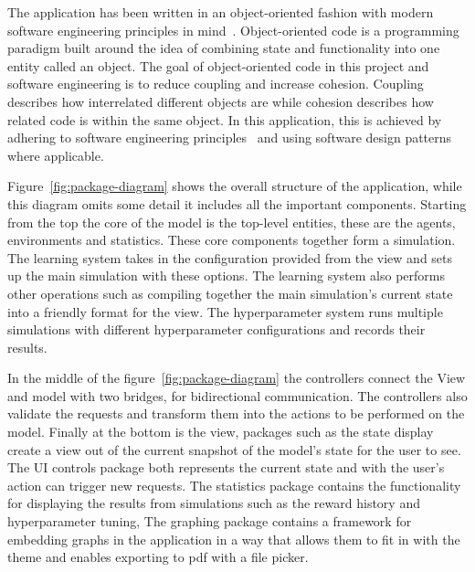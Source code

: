 \documentclass[]{final_report}
\begin{document}
The application has been written in an object-oriented fashion with modern software engineering principles in mind~\cite{van2008software}. Object-oriented code is a programming paradigm built around the idea of combining state and functionality into one entity called an object. The goal of object-oriented code in this project and software engineering is to reduce coupling and increase cohesion. Coupling describes how interrelated different objects are while cohesion describes how related code is within the same object. In this application, this is achieved by adhering to software engineering principles~\cite{softwareEngineringPrinciples} and using software design patterns where applicable.

Figure~\ref{fig:package-diagram} shows the overall structure of the application, while this diagram omits some detail it includes all the important components. Starting from the top the core of the model is the top-level entities, these are the agents, environments and statistics. These core components together form a simulation. The learning system takes in the configuration provided from the view and sets up the main simulation with these options. The learning system also performs other operations such as compiling together the main simulation's current state into a friendly format for the view. The hyperparameter system runs multiple simulations with different hyperparameter configurations and records their results.

In the middle of the figure~\ref{fig:package-diagram} the controllers connect the View and model with two bridges, for bidirectional communication. The controllers also validate the requests and transform them into the actions to be performed on the model. Finally at the bottom is the view, packages such as the state display create a view out of the current snapshot of the model's state for the user to see. The UI controls package both represents the current state and with the user's action can trigger new requests. The statistics package contains the functionality for displaying the results from simulations such as the reward history and hyperparameter tuning, The graphing package contains a framework for embedding graphs in the application in a way that allows them to fit in with the theme and enables exporting to pdf with a file picker.
\end{document}
